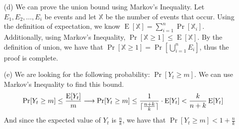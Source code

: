 \documentclass[11pt]{article}
\newcommand{\E}{\mathop{\textrm{E}}}
\newcommand{\X}{\mathbb{X}}
\DeclarePairedDelimiter{\ceil}{\lceil}{\rceil}
\begin{document}
\begin{itemize}
  \item[(d)]
    We can prove the union bound using Markov's Inequality. Let $E_1, E_2, \dots, E_i$ be
    events and let $\X$ be the number of events that occur. Using the definition of 
    expectation, we know $\E[\X] = \sum_{i=1}^{n} \Pr[\X_i]$. Additionally, using Markov's 
    Inequality, $\Pr[\X \geq 1] \leq \E[\X] $. By the definition of union, we have that 
    $\Pr[\X \geq 1] = \Pr[\bigcup_{i=1}^{n} E_i]$, thus the proof is complete.
  \item[(e)]
    We are looking for the following probability: $\Pr[Y_t \geq m]$. We can use Markov's 
    Inequality to find this bound.
    \begin{gather}
      \Pr[Y_t \geq m] \leq \frac{\E[Y_t]}{m} \longrightarrow  \Pr[Y_t \geq m] \leq 
      \frac {1}{\ceil{\frac{n + k}{k}}} \cdot \E[Y_t]
      < \frac{k}{n+k} \E[Y_t]
    \end{gather}
    And since the expected value of $Y_t$ is $\frac{n}{k}$, we have that 
    $\Pr[Y_t \geq m] < 1 + \frac{n}{k}$
\end{itemize}
\end{document}
